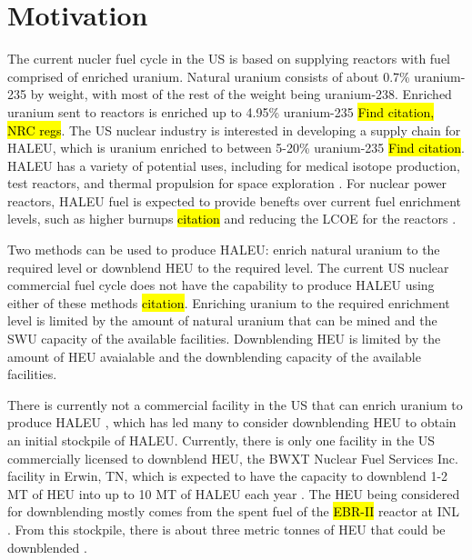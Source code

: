 \section{Motivation}
The current nucler fuel cycle in the US is based on supplying reactors 
with fuel comprised of enriched uranium. Natural uranium consists of 
about 0.7\% uranium-235 by weight, with most of the rest of the weight being 
uranium-238. Enriched uranium sent to reactors is enriched up to 4.95\% 
uranium-235 \hl{Find citation, NRC regs}. The US nuclear industry is 
interested in developing a supply chain for \gls{HALEU}, which is 
uranium enriched to between 5-20\% uranium-235 \hl{Find citation}. \gls{HALEU}
has a variety of potential uses, including for medical isotope production,
test reactors, and thermal propulsion for space exploration \cite{nagley_ha-leu_2020}.
For nuclear power reactors, \gls{HALEU} fuel is expected to provide benefts 
over current fuel enrichment levels, such as higher burnups \hl{citation} and 
reducing the \gls{LCOE} for the reactors \cite{carlson_economic_2020}.

Two methods can be used to produce \gls{HALEU}: enrich natural uranium to the 
required level or downblend \gls{HEU} to the required level. The current US
nuclear commercial fuel cycle does not have the capability to produce 
\gls{HALEU} using either of these methods \hl{citation}. Enriching uranium 
to the required enrichment level is limited by the amount of natural uranium 
that can be mined and the \gls{SWU} capacity of the available facilities. 
Downblending \gls{HEU} is limited by the amount of \gls{HEU} avaialable and 
the downblending capacity of the available facilities. 

There is currently not a commercial facility in the US that can enrich 
uranium to produce \gls{HALEU} \cite{hussain_nei_2018}, which has led 
many to consider downblending \gls{HEU} to obtain an initial stockpile of 
\gls{HALEU}. 
Currently, there is only one facility in the US commercially licensed to 
downblend \gls{HEU}, the BWXT Nuclear Fuel Services Inc. facility in 
Erwin, TN, which is expected to have the capacity to downblend 1-2 
MT of \gls{HEU} into up to 10 MT of \gls{HALEU} each year \cite{nagley_ha-leu_2020}.
The \gls{HEU} being considered for downblending mostly comes from the spent 
fuel of the \hl{EBR-II} reactor at \gls{INL} \cite{patterson_haleu_2019}. From 
this stockpile, there is about three metric tonnes of \gls{HEU} that 
could be downblended \cite{patterson_haleu_2019}.



